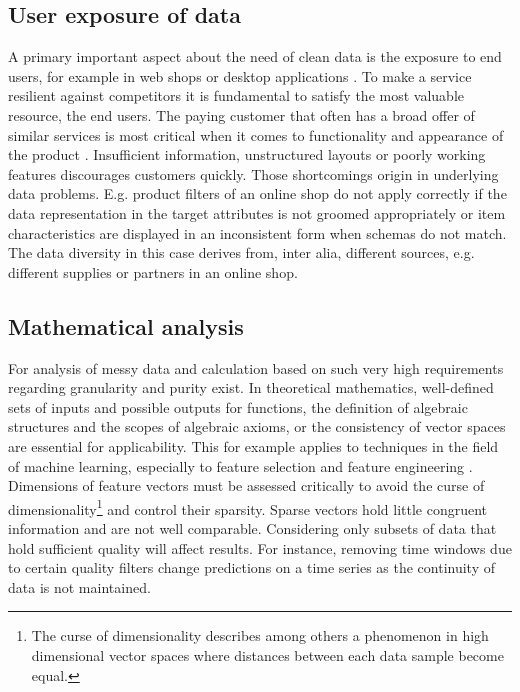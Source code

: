 \subsection{User exposure of data}

A primary important aspect about the need of clean data is the exposure to end users, for example in web shops or desktop applications \cite{kim_niehm_2009}. To make a service resilient against competitors it is fundamental to satisfy the most valuable resource, the end users. The paying customer that often has a broad offer of similar services is most critical when it comes to functionality and appearance of the product \cite{huitfeldt_middleton_2001}. Insufficient information, unstructured layouts or poorly working features discourages customers quickly. Those shortcomings origin in underlying data problems. E.g. product filters of an online shop do not apply correctly if the data representation in the target attributes is not groomed appropriately or item characteristics are displayed in an inconsistent form when schemas do not match. The data diversity in this case derives from, inter alia, different sources, e.g. different supplies or partners in an online shop.

\subsection{Mathematical analysis} 

For analysis of messy data and calculation based on such 
very high requirements regarding granularity and purity exist. In theoretical mathematics, well-defined sets of inputs and possible outputs for functions, the definition of algebraic structures and the scopes of algebraic axioms, or the consistency of vector spaces are essential for applicability. This for example applies to techniques in the field of machine learning, especially to feature selection and feature engineering \cite{mitchell_1999}. Dimensions of feature vectors must be assessed critically to avoid the curse of dimensionality\footnote{The curse of dimensionality describes among others a phenomenon in high dimensional vector spaces where distances between each data sample become equal.} and control their sparsity. Sparse vectors hold little congruent information and are not well comparable. Considering only subsets of data that hold sufficient quality will affect results. For instance, removing time windows due to certain quality filters change predictions on a time series as the continuity of data is not maintained.

